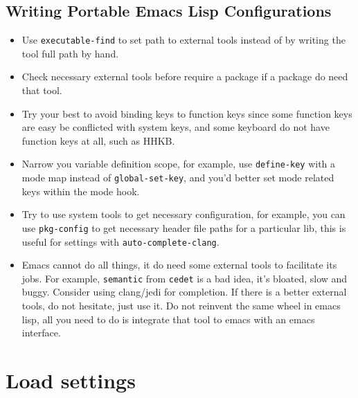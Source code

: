 \documentclass[11pt]{article}
\begin{document}
\subsection*{Writing Portable Emacs Lisp Configurations}
\label{sec-3-3}
\begin{itemize}
\item Use \texttt{executable-find} to set path to external tools instead of by writing the
tool full path by hand.
\item Check necessary external tools before require a package if a package do need
that tool.
\item Try your best to avoid binding keys to function keys since some function keys
are easy be conflicted with system keys, and some keyboard do not have
function keys at all, such as HHKB.
\item Narrow you variable definition scope, for example, use \texttt{define-key} with a
mode map instead of \texttt{global-set-key}, and you'd better set mode related keys
within the mode hook.
\item Try to use system tools to get necessary configuration, for example, you can
use \texttt{pkg-config} to get necessary header file paths for a particular lib,
this is useful for settings with \texttt{auto-complete-clang}.
\item Emacs cannot do all things, it do need some external tools to facilitate its
jobs. For example, \texttt{semantic} from \texttt{cedet} is a bad idea, it's bloated, slow
and buggy. Consider using clang/jedi for completion. If there is a better
external tools, do not hesitate, just use it. Do not reinvent the same wheel
in emacs lisp, all you need to do is integrate that tool to emacs with an emacs
interface.
\end{itemize}

\section*{Load settings}
\label{sec-4}
\end{document}
